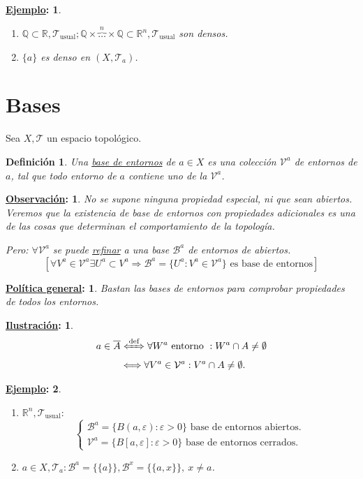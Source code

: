 \documentclass[10pt,a4paper,openright]{book}
\theoremstyle{break}
\newtheorem*{defi}{Definición}
\newtheorem*{obs}{\underline{Observación}:}
\newtheorem*{ej}{\underline{Ejemplo}:}
\newtheorem*{pg}{\underline{Política general}:}
\newtheorem*{il}{\underline{Ilustración}:}
\begin{document}
\begin{ej}
\begin{enumerate}
    \item $\mathbb{Q} \subset \mathbb{R}, \mathcal{T}_{\text{usual}}; \mathbb{Q} \times \overbrace{\ldots}^{n} \times \mathbb{Q} \subset \mathbb{R}^n, \mathcal{T}_{\text{usual}}$ son densos.
    \item $\{a\}$ es denso en $\left( X, \mathcal{T}_a \right)$.
\end{enumerate}
\end{ej}

\section{Bases}%
\label{sec:bases}
Sea $X, \mathcal{T}$ un espacio topológico.
\begin{defi}
Una \underline{base de entornos} de $a \in X$ es una colección $\mathcal{V}^a$ de entornos de $a$, tal que todo entorno de $a$ contiene uno de la $\mathcal{V}^a$.
\end{defi}

\begin{obs}
No se supone ninguna propiedad especial, ni que sean abiertos. Veremos que la existencia de base de entornos con propiedades adicionales es una de las cosas que determinan el comportamiento de la topología.

Pero: $\forall \mathcal{V}^a$ se puede \underline{refinar} a una base $\mathcal{B}^a$ de entornos de abiertos. 
\[
\left[ \forall V^a \in \mathcal{V}^a \exists U^a \subset V^a \Rightarrow \mathcal{B}^a = \{U^a: V^a \in \mathcal{V}^a\} \text{ es base de entornos} \right]
\]
\end{obs}

\begin{pg}
    Bastan las bases de entornos para comprobar propiedades de todos los entornos.
\end{pg}

\begin{il}    
\begin{align*}
    a \in \overline{A} &\xLeftrightarrow{\text{def}} \forall W^a \text{ entorno }: W^a \cap A \neq \emptyset\\
   &\Longleftrightarrow \forall V^a \in \mathcal{V}^a: V^a\cap A \neq \emptyset 
.\end{align*}
\end{il}

\begin{ej}
\begin{enumerate}
    \item $\mathbb{R}^n, \mathcal{T}_{\text{usual}}: $
    \[
    \begin{cases}
    \mathcal{B}^a = \{B\left( a, \varepsilon \right): \varepsilon > 0\} \text{ base de entornos abiertos.}  \\
    \mathcal{V}^a = \{B\left[ a, \varepsilon \right]: \varepsilon > 0\} \text{ base de entornos cerrados.} 
    \end{cases} 
    \]
    \item $a \in X, \mathcal{T}_a : \mathcal{B}^a = \{\{a\}\}, \mathcal{B}^x = \{\{a, x\}\},\ x \neq a$.
\end{enumerate}
\end{ej}
\end{document}
